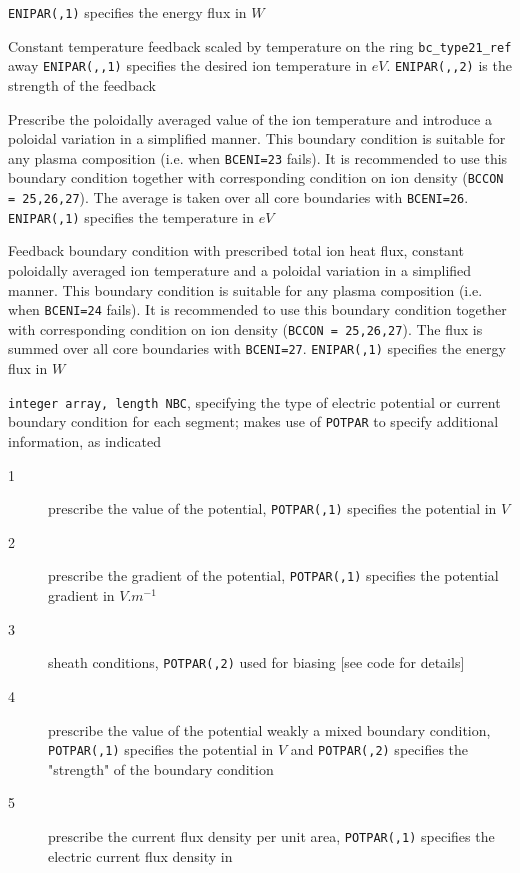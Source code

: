 \documentclass[a4paper,10pt]{report}
\begin{document}
\begin{description}
\begin{description}
  {\tt ENIPAR(,1)} specifies the energy flux in $W$
  \item[25] Constant temperature feedback scaled by temperature on the ring {\tt bc\_type21\_ref} away
  {\tt ENIPAR(,,1)} specifies the desired ion temperature in $eV$.
  {\tt ENIPAR(,,2)} is the strength of the feedback
  \item[26] Prescribe the poloidally averaged value of the ion temperature and introduce a poloidal variation in a simplified manner. This boundary condition is suitable for any plasma composition (i.e. when {\tt BCENI=23} fails). It is recommended to use this boundary condition together with corresponding condition on ion density ({\tt BCCON = 25,26,27}). The average is taken over all core boundaries with {\tt BCENI=26}.
  {\tt ENIPAR(,1)} specifies the temperature in $eV$
  \item[27] Feedback boundary condition with prescribed total ion heat flux, constant poloidally averaged ion temperature and a poloidal variation in a simplified manner. This boundary condition is suitable for any plasma composition (i.e. when {\tt BCENI=24} fails). It is recommended to use this boundary condition together with corresponding condition on ion density ({\tt BCCON = 25,26,27}). The flux is summed over all core boundaries with {\tt BCENI=27}.
  {\tt ENIPAR(,1)} specifies the energy flux in $W$
  \end{description}
\item[BCPOT] {\tt integer array, length NBC}, specifying the
  type of electric potential or current boundary condition for each
  segment; makes use of {\tt POTPAR} to specify additional
  information, as indicated
  \begin{description}
  \item[1] prescribe the value of the potential, {\tt POTPAR(,1)}
  specifies the potential in $V$
  \item[2] prescribe the gradient of the potential, {\tt POTPAR(,1)}
  specifies the potential gradient in $V.m^{-1}$
  \item[3] sheath conditions,
  {\tt POTPAR(,2)} used for biasing [see code for details]
  \item[4] prescribe the value of the potential weakly a mixed
  boundary condition, {\tt POTPAR(,1)} specifies the potential in
  $V$ and {\tt POTPAR(,2)} specifies the "strength" of the
  boundary condition
  \item[5] prescribe the current flux density per unit area,
    {\tt POTPAR(,1)} specifies the electric current flux density in

\end{description}
\end{description}
\end{document}
